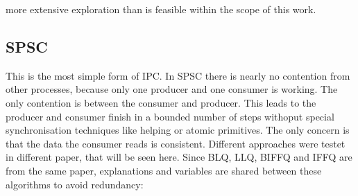 more extensive exploration than is feasible within the scope of this work.

\subsection{\acf{SPSC}}\label{subsec:single-producer-and-single-consumer}
This is the most simple form of \ac{IPC}. In \ac{SPSC} there is nearly no contention from other processes, because only one producer and one consumer is working. The only contention is between the consumer and producer. This leads to the producer and consumer finish in a bounded number of steps withoput special synchronisation techniques like helping or atomic primitives. The only concern is that the data the consumer reads is consistent. Different approaches were testet in different paper, that will be seen here. Since \ac{BLQ}, \ac{LLQ}, \ac{BIFFQ} and \ac{IFFQ} are from the same paper, explanations and variables are shared between these algorithms to avoid redundancy:

